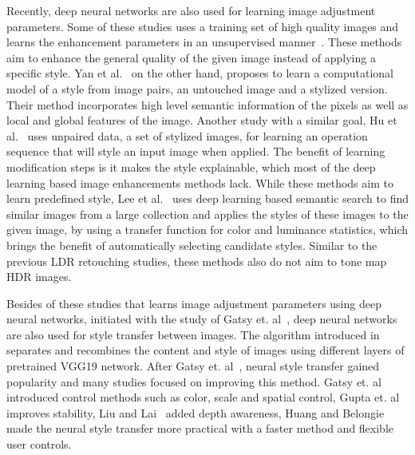 Recently, deep neural networks are also used for learning image adjustment parameters. Some of these studies uses a training set of high quality images and learns the enhancement parameters in an unsupervised manner~\cite{park2018distort, chen2018deep,ignatov2018wespe}. These methods aim to enhance the general quality of the given image instead of applying a specific style. Yan et al.~\cite{yan2016automatic} on the other hand, proposes to learn a computational model of a style from image pairs, an untouched image and a stylized version. Their method incorporates high level semantic information of the pixels as well as local and global features of the image. Another study with a similar goal, Hu et al.~\cite{hu2018exposure} uses unpaired data, a set of stylized images, for learning an operation sequence that will style an input image when applied. The benefit of learning modification steps is it makes the style explainable, which most of the deep learning based image enhancements methods lack. While these methods aim to learn predefined style, Lee et al.~\cite{lee2016automatic} uses deep learning based semantic search to find similar images from a large collection and applies the styles of these images to the given image, by using a transfer function for color and luminance statistics, which brings the benefit of automatically selecting candidate styles. Similar to the previous LDR retouching studies, these methods also do not aim to tone map HDR images.

Besides of these studies that learns image adjustment parameters using deep neural networks, initiated with the study of Gatsy et. al~\cite{gatys2016image}, deep neural networks are also used for style transfer between images. The algorithm introduced in~\cite{gatys2016image} separates and recombines the content and style of images using different layers of pretrained VGG19 network. After Gatsy et. al~\cite{gatys2016image}, neural style transfer gained popularity and many studies focused on improving this method. Gatsy et. al~\cite{gatys2017controlling} introduced control methods such as color, scale and spatial control, Gupta et. al~\cite{gupta2017characterizing} improves stability, Liu and Lai~\cite{liu2017depth} added depth awareness, Huang and Belongie~\cite{huang2017arbitrary} made the neural style transfer more practical with a faster method and flexible user controls.


